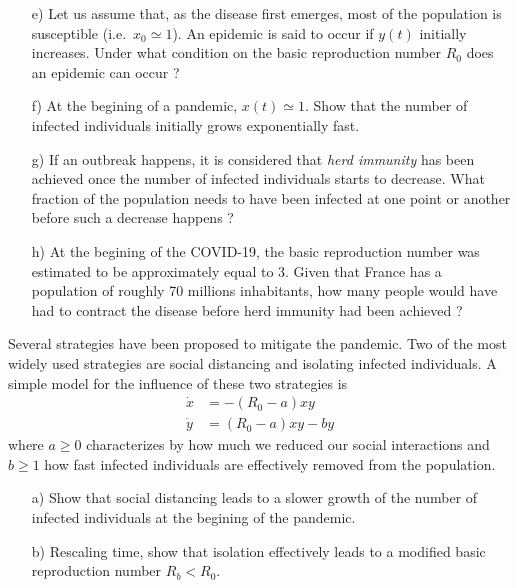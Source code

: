 \begin{problem}
\begin{enumerate}
  \item[e)] Let us assume that, as the disease first emerges, most of the population is susceptible (i.e.\ $x_0 \simeq 1$).
    An epidemic is said to occur if $y(t)$ initially increases.
    Under what condition on the basic reproduction number $R_0$ does an epidemic can occur ?

  \item[f)] At the begining of a pandemic, $x(t) \simeq 1$.
    Show that the number of infected individuals initially grows exponentially fast.

  \item[g)] If an outbreak happens, it is considered that \emph{herd immunity} has been achieved once the number of infected individuals starts to decrease.
    What fraction of the population needs to have been infected at one point or another before such a decrease happens ?

  \item[h)] At the begining of the COVID-19, the basic reproduction number was estimated to be approximately equal to 3.
    Given that France has a population of roughly 70 millions inhabitants, how many people would have had to contract the disease before herd immunity had been achieved ?
  \end{enumerate}
\end{problem}

\bigskip

\begin{problem}
  Several strategies have been proposed to mitigate the pandemic.
  Two of the most widely used strategies are social distancing and isolating infected individuals.
  A simple model for the influence of these two strategies is
  \[
  \begin{aligned}
    \dot{x} & = -(R_0 - a) xy \\
    \dot{y} & = (R_0 - a) xy - b y
  \end{aligned}
  \]
  where $a \geq 0$ characterizes by how much we reduced our social interactions and $b \geq 1$ how fast infected individuals are effectively removed from the population.

  \bigskip

  \begin{enumerate}
  \item[a)] Show that social distancing leads to a slower growth of the number of infected individuals at the begining of the pandemic.

  \item[b)] Rescaling time, show that isolation effectively leads to a modified basic reproduction number $R_b < R_0$.
  \end{enumerate}
\end{problem}
